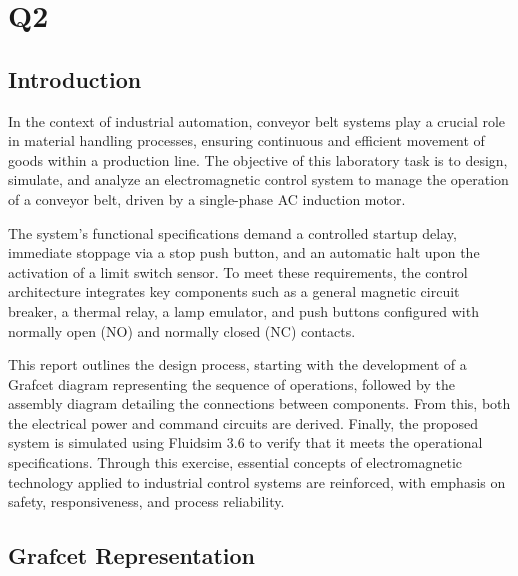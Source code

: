 \section{Q2} 

\subsection{Introduction} \label{sec:Introduction}

In the context of industrial automation, conveyor belt systems play a crucial role in material handling processes, 
ensuring continuous and efficient movement of goods within a production line. The objective of this laboratory task 
is to design, simulate, and analyze an electromagnetic control system to manage the operation of a conveyor belt, 
driven by a single-phase AC induction motor.

The system's functional specifications demand a controlled startup delay, immediate stoppage via a stop push 
button, and an automatic halt upon the activation of a limit switch sensor. To meet these requirements, the 
control architecture integrates key components such as a general magnetic circuit breaker, a thermal relay, 
a lamp emulator, and push buttons configured with normally open (NO) and normally closed (NC) contacts.

This report outlines the design process, starting with the development of a Grafcet diagram representing the 
sequence of operations, followed by the assembly diagram detailing the connections between components. From this, 
both the electrical power and command circuits are derived. Finally, the proposed system is simulated using 
Fluidsim 3.6 to verify that it meets the operational specifications. Through this exercise, essential concepts 
of electromagnetic technology applied to industrial control systems are reinforced, with emphasis on safety, 
responsiveness, and process reliability.

\subsection{Grafcet Representation} \label{sec:Grafcet_Representation}

